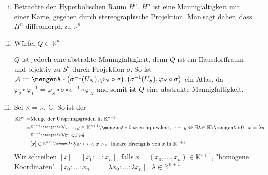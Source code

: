 \begin{enumerate}[(i)]
		\item Betrachte den Hyperbolischen Raum $H^n$.
		$H^n$ ist eine Mannigfaltigkeit mit einer Karte, gegeben durch stereographische Projektion. Man sagt daher, dass $H^n$ diffeomorph zu $\mathds{R}^n$
		\item Würfel $Q\subset \mathds{R}^n$
		\begin{figure}[H]
		\end{figure}
		$Q$ ist jedoch eine abstrakte Mannigfaltigkeit, denn $Q$ ist ein Hausdorffraum und bijektiv zu $S^n$ durch Projektion $\sigma$. So ist $\mathcal{A} := \set{\enbrace*{\sigma^{-1}(U_N),\varphi_N \circ \sigma},\enbrace*{\sigma^{-1}(U_S),\varphi_S \circ \sigma}}$ ein Atlas, da $\varphi_2 \circ \varphi_1^{-1} = \varphi_S \circ \sigma \circ \sigma^{-1} \circ \varphi_N$ und somit ist $Q$ eine abstrakte Mannigfaltigkeit.
		\item Sei $\mathds{K} = \mathds{R},\ \mathds{C}$. So ist der 
		\begin{align*}
			\mathds{K}\mathds{P}^n =& \text{Menge der Ursprungsgraden in $\mathds{K}^{n+1}$}\\
			=& \nicefrac{\mathds{K}^{n+1}\backslash \set{0}}{\sim},\ x,y\in \mathds{K}^{n+1}\backslash \set{0}\ \text{seien äquivalent},\ x\sim y \Leftrightarrow \exists \lambda\in \mathds{K}\backslash \set{0}: x = \lambda y\\
			=& \nicefrac{\mathds{K}^{n+1}\backslash \set{0}}{\mathds{K}^*}\ \text{wobei}\\
			&[x]\in \nicefrac{\mathds{K}^{n+1}\backslash \set{0}}{\mathds{K}^*} \mapsto\ <x>_{\mathds{K}}\ \text{lineare Erzeugnis von $x$ in $\mathds{K}^{n+1}$}
		\end{align*}
		Wir schreiben $[x] = [x_0:\ldots:x_n]$, falls $x=(x_0,\ldots,x_n)\in \mathds{K}^{n+1}$, "homogene Koordinaten".
		 $[x_0:\ldots:x_n] = [\lambda x_0:\ldots:\lambda x_n],\ \lambda \in \mathds{K}^{n+1}$

\end{enumerate}
